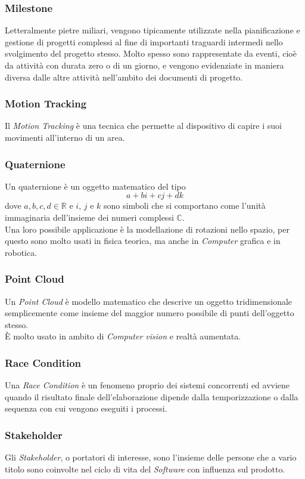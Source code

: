 \subsubsection{Milestone}
Letteralmente pietre miliari, vengono tipicamente utilizzate nella pianificazione e gestione
di progetti complessi al fine di importanti traguardi intermedi nello svolgimento del progetto
stesso. Molto spesso sono rappresentate da eventi, cioè da attività con durata zero o di un giorno,
e vengono evidenziate in maniera diversa dalle altre attività nell'ambito dei documenti di progetto.

\subsubsection{Motion Tracking}
Il \emph{Motion Tracking} è una tecnica che permette al dispositivo di capire i suoi movimenti all'interno di un area.

\subsubsection{Quaternione}
Un quaternione è un oggetto matematico del tipo
$$a+bi+cj+dk$$
dove $a,b,c,d\in \mathbb{R}$ e $i$, $j$ e $k$ sono simboli che si comportano come l'unità immaginaria dell'insieme dei numeri complessi $\mathbb{C}$.\\
Una loro possibile applicazione è la modellazione di rotazioni nello spazio, per questo sono molto usati in fisica teorica, ma anche in \emph{Computer} grafica e in robotica.

\subsubsection{Point Cloud}
Un \emph{Point Cloud} è modello matematico che descrive un oggetto tridimensionale semplicemente come insieme del maggior numero possibile di punti dell'oggetto stesso.\\
È molto usato in ambito di \emph{Computer vision} e realtà aumentata.

\subsubsection{Race Condition}
Una \emph{Race Condition} è un fenomeno proprio dei sistemi concorrenti ed avviene quando il risultato finale dell'elaborazione dipende dalla temporizzazione o dalla sequenza con cui vengono eseguiti i processi. 

\subsubsection{Stakeholder}
Gli \emph{Stakeholder}, o portatori di interesse, sono l'insieme delle persone che a vario titolo sono coinvolte nel ciclo di vita del \emph{Software} con influenza sul prodotto.

